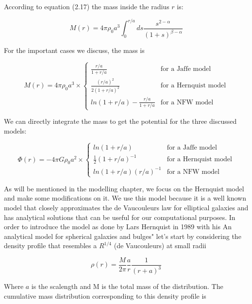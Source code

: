 According to equation (2.17) the mass inside the radius $r$ is:

\begin{equation}
M(r)=4\pi \rho_{0}a^{3}\int_{0}^{r/a}ds\frac{s^{2-\alpha}}{(1+s)^{\beta-\alpha}}
\end{equation}

For the important cases we discuss, the mass is

\begin{equation}
M(r) = 4\pi \rho_{0}a^{3} \times \left\lbrace
\begin{array}{lll}
\frac{r/a}{1+r/a} & \text{for a Jaffe model}\\
\frac{(r/a)^{2}}{2(1+r/a)^{2}} & \text{for a Hernquist model}\\
ln(1+r/a)-\frac{r/a}{1+r/a} & \text{for a NFW model}
\end{array}
\right.
\end{equation} 

We can directly integrate the mass to get the potential for the three discussed models:

\begin{equation}
\Phi(r) = -4\pi G\rho_{0}a^{2} \times \left\lbrace
\begin{array}{lll}
ln(1+r/a) & \text{for a Jaffe model}\\
\frac{1}{2}(1+r/a)^{-1} & \text{for a Hernquist model}\\
ln(1+r/a)(r/a)^{-1} & \text{for a NFW model}
\end{array}
\right.
\end{equation} 

As will be mentioned in the modelling chapter, we focus on the Hernquist model and make some modifications on it. We use this model because it is a well known model that closely approximates the de Vaucouleurs law for elliptical galaxies and has analytical solutions that can be useful for our computational purposes. In order to introduce the model as done by Lars Hernquist in 1989 with his An analytical model for spherical galaxies and bulges" let's start by considering the density profile that resembles a $R^{1/4}$ (de Vaucouleurs) at small radii

\begin{equation}
\rho(r)=\frac{M}{2\pi}\frac{a}{r}\frac{1}{\left(r+a\right)^{3}}
\end{equation}

Where $a$ is the scalength and M is the total mass of the distribution. The cumulative mass distribution corresponding to this density profile is

